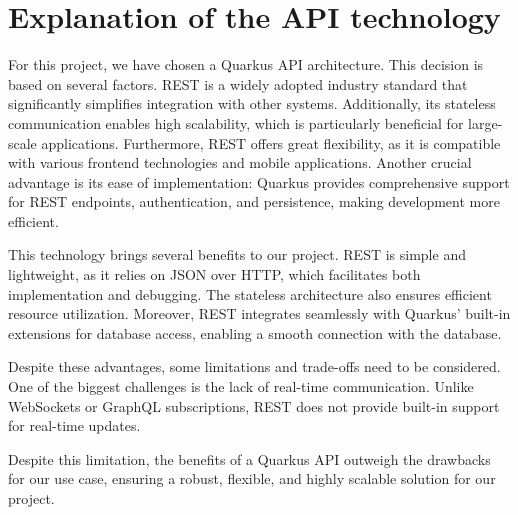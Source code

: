 \documentclass[a4paper, 11pt]{article}
\begin{document}
\section{Explanation of the API technology} \label{sec:explanation-of-the-api-technology}
For this project, we have chosen a Quarkus API architecture. This decision is based on several factors. REST is a widely adopted industry standard that significantly simplifies integration with other systems. Additionally, its stateless communication enables high scalability, which is particularly beneficial for large-scale applications. Furthermore, REST offers great flexibility, as it is compatible with various frontend technologies and mobile applications. Another crucial advantage is its ease of implementation: Quarkus provides comprehensive support for REST endpoints, authentication, and persistence, making development more efficient.

This technology brings several benefits to our project. REST is simple and lightweight, as it relies on JSON over HTTP, which facilitates both implementation and debugging. The stateless architecture also ensures efficient resource utilization. Moreover, REST integrates seamlessly with Quarkus’ built-in extensions for database access, enabling a smooth connection with the database.

Despite these advantages, some limitations and trade-offs need to be considered. One of the biggest challenges is the lack of real-time communication. Unlike WebSockets or GraphQL subscriptions, REST does not provide built-in support for real-time updates.

Despite this limitation, the benefits of a Quarkus API outweigh the drawbacks for our use case, ensuring a robust, flexible, and highly scalable solution for our project.%

\end{document}
